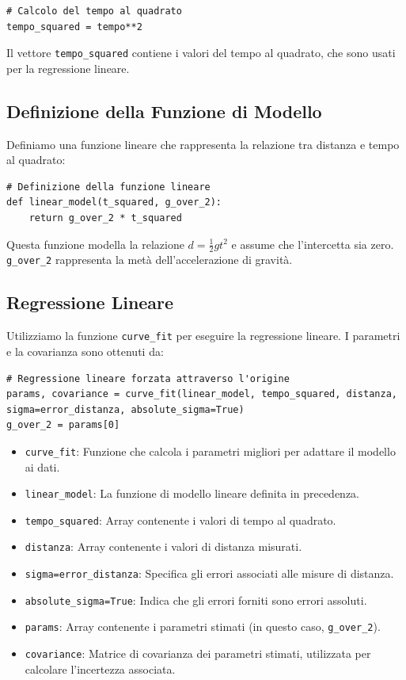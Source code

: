 \documentclass[a4paper,12pt]{article}
\begin{document}
\begin{lstlisting}
# Calcolo del tempo al quadrato
tempo_squared = tempo**2
\end{lstlisting}

Il vettore \texttt{tempo\_squared} contiene i valori del tempo al quadrato, che sono usati per la regressione lineare.

\subsection{Definizione della Funzione di Modello}
Definiamo una funzione lineare che rappresenta la relazione tra distanza e tempo al quadrato:

\begin{lstlisting}
# Definizione della funzione lineare
def linear_model(t_squared, g_over_2):
    return g_over_2 * t_squared
\end{lstlisting}

Questa funzione modella la relazione \( d = \frac{1}{2} g t^2 \) e assume che l'intercetta sia zero. \texttt{g\_over\_2} rappresenta la metà dell'accelerazione di gravità.

\subsection{Regressione Lineare}
Utilizziamo la funzione \texttt{curve\_fit} per eseguire la regressione lineare. I parametri e la covarianza sono ottenuti da:

\begin{lstlisting}
# Regressione lineare forzata attraverso l'origine
params, covariance = curve_fit(linear_model, tempo_squared, distanza, sigma=error_distanza, absolute_sigma=True)
g_over_2 = params[0]
\end{lstlisting}

\begin{itemize}
    \item \texttt{curve\_fit}: Funzione che calcola i parametri migliori per adattare il modello ai dati.
    \item \texttt{linear\_model}: La funzione di modello lineare definita in precedenza.
    \item \texttt{tempo\_squared}: Array contenente i valori di tempo al quadrato.
    \item \texttt{distanza}: Array contenente i valori di distanza misurati.
    \item \texttt{sigma=error\_distanza}: Specifica gli errori associati alle misure di distanza.
    \item \texttt{absolute\_sigma=True}: Indica che gli errori forniti sono errori assoluti.
    \item \texttt{params}: Array contenente i parametri stimati (in questo caso, \texttt{g\_over\_2}).
    \item \texttt{covariance}: Matrice di covarianza dei parametri stimati, utilizzata per calcolare l'incertezza associata.
\end{itemize}
\end{document}
